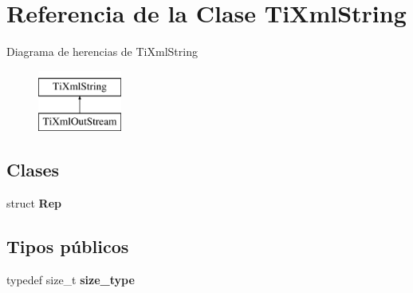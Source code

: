 \hypertarget{classTiXmlString}{\section{\-Referencia de la \-Clase \-Ti\-Xml\-String}
\label{classTiXmlString}
}
\-Diagrama de herencias de \-Ti\-Xml\-String\begin{figure}[H]
\begin{center}
\leavevmode
\includegraphics[height=2.000000cm]{classTiXmlString}
\end{center}
\end{figure}
\subsection*{\-Clases}
\begin{DoxyCompactItemize}
\item 
struct {\bfseries \-Rep}
\end{DoxyCompactItemize}
\subsection*{\-Tipos públicos}
\begin{DoxyCompactItemize}
\item 
\hypertarget{classTiXmlString_abeb2c1893a04c17904f7c06546d0b971}{typedef size\-\_\-t {\bfseries size\-\_\-type}}\label{classTiXmlString_abeb2c1893a04c17904f7c06546d0b971}

\end{DoxyCompactItemize}
